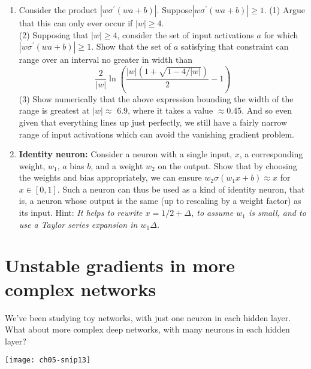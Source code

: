 \begin{enumerate}
    \item Consider the product $\left|w \sigma^{\prime}(w a+b)\right|$. Suppose$\left|w \sigma^{\prime}(w a+b)\right| \geq 1$. 
    (1) Argue that this can only ever occur if $|w| \geq 4$. \\
    (2) Supposing that $|w| \geq 4$, consider the set of input activations $a$ for which $\left|w \sigma^{\prime}(w a+b)\right| \geq 1$. Show that the set of $a$ satisfying that constraint can range over an interval no greater in width than 
    \begin{equation}
        \frac{2}{|w|} \ln \left(\frac{|w|(1+\sqrt{1-4 /|w|})}{2}-1\right)
        \label{eq:c05-123}
        \end{equation}
    (3) Show numerically that the above expression bounding the width of the range is greatest at $|w| \approx$ 6.9, where it takes a value $\approx$0.45. And so even given that everything lines up just perfectly, we still have a fairly narrow range of input activations which can avoid the vanishing gradient problem.
    
    \item \textbf{Identity neuron:}\label{page:Identityneuron} Consider a neuron with a single input, $x$, a corresponding weight, $w_1$, $a$ bias $b$, and a weight $w_2$ on the output. Show that by choosing the weights and bias appropriately, we can ensure $w_{2} \sigma\left(w_{1} x+b\right) \approx x$ for $x \in[0,1]$. Such a neuron can thus be used as a kind of identity neuron, that is, a neuron whose output is the same (up to rescaling by a weight factor) as its input. Hint: \textit{It helps to rewrite $x=1 / 2+\Delta$, to assume $w_1$ is small, and to use a Taylor series expansion in $w_1\Delta$.}
    
\end{enumerate}


\section{Unstable gradients in more complex networks}

We've been studying toy networks, with just one neuron in each hidden layer. What about more complex deep networks, with many neurons in each hidden layer?
\begin{figure*}[tph]
    \texttt{[image: ch05-snip13]}
    \label{fig:ch05-snip13}
    \end{figure*}

